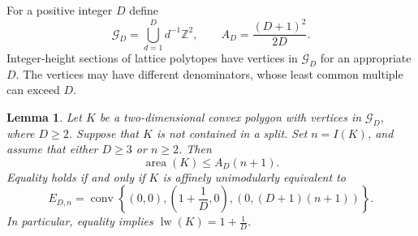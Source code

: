 \documentclass[reqno, 11pt]{article}
\numberwithin{equation}{section}
\newtheorem{lemma}[lemma]{Lemma}
\theoremstyle{definition}
\newcommand{\Z}{\mathbb Z}
\DeclareMathOperator{\area}{area}
\DeclareMathOperator{\lw}{lw}
\DeclareMathOperator{\conv}{conv}
\numberwithin{equation}{section}
\begin{document}
For a positive integer $D$ define
\[
 \mathcal G_D=\bigcup_{d=1}^D d^{-1}\Z^2, \qquad A_D=\frac{(D+1)^2}{2D}.
\]
Integer-height sections of lattice polytopes have vertices in $\mathcal G_D$ for an appropriate $D$. 
The vertices may have different denominators, whose least common multiple can exceed $D$.


\begin{lemma}\label{p:denominator}
Let $K$ be a two-dimensional convex polygon with vertices in $\mathcal G_D$, where $D\ge2$. Suppose that $K$ is not contained
in a split. Set $n=I(K)$, and assume that either $D\ge3$ or $n\ge2$. Then
\[
 \area(K)\le A_D(n+1).
\]
Equality holds if and only if $K$ is affinely unimodularly equivalent to
\[
 E_{D,n}=\conv\left\{(0,0),\left(1+\frac{1}{D},0\right),(0,(D+1)(n+1))\right\}.
\]
In particular, equality implies $\lw(K)=1+\frac{1}{D}$.
\end{lemma}
\end{document}

